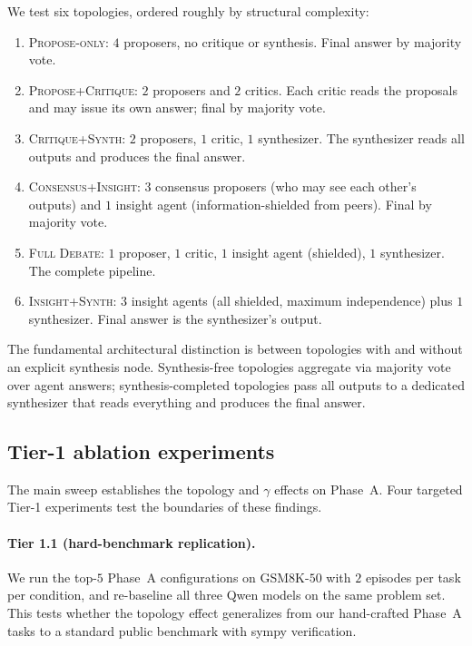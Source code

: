 \documentclass[11pt]{amsart}
\newcommand{\g}{\gamma}
\newcommand\1{{\mathds{1}}}
\theoremstyle{definition}
\theoremstyle{remark}
\numberwithin{equation}{section}
\begin{document}
We test six topologies, ordered roughly by structural complexity:
\begin{enumerate}[leftmargin=1.4em, itemsep=2pt]
\item \textsc{Propose-only}: $4$ proposers, no critique or synthesis. Final answer by majority vote.
\item \textsc{Propose+Critique}: $2$ proposers and $2$ critics. Each critic reads the proposals and may issue its own answer; final by majority vote.
\item \textsc{Critique+Synth}: $2$ proposers, $1$ critic, $1$ synthesizer. The synthesizer reads all outputs and produces the final answer.
\item \textsc{Consensus+Insight}: $3$ consensus proposers (who may see each other's outputs) and $1$ insight agent (information-shielded from peers). Final by majority vote.
\item \textsc{Full Debate}: $1$ proposer, $1$ critic, $1$ insight agent (shielded), $1$ synthesizer. The complete pipeline.
\item \textsc{Insight+Synth}: $3$ insight agents (all shielded, maximum independence) plus $1$ synthesizer. Final answer is the synthesizer's output.
\end{enumerate}

The fundamental architectural distinction is between topologies with and without an explicit synthesis node.
Synthesis-free topologies aggregate via majority vote over agent answers; synthesis-completed topologies pass all outputs to a dedicated synthesizer that reads everything and produces the final answer.

\subsection{Tier-1 ablation experiments}\label{app:tier1}

The main sweep establishes the topology and $\g$ effects on Phase~A. Four targeted Tier-1 experiments test the boundaries of these findings.

\paragraph{Tier 1.1 (hard-benchmark replication).}
We run the top-$5$ Phase~A configurations on GSM8K-$50$ with $2$ episodes per task per condition, and re-baseline all three Qwen models on the same problem set.
This tests whether the topology effect generalizes from our hand-crafted Phase~A tasks to a standard public benchmark with sympy verification.
\end{document}
